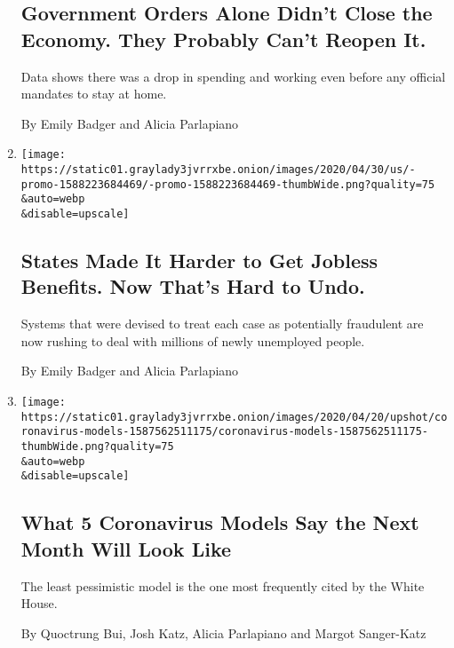 \begin{enumerate}
  \hypertarget{government-orders-alone-didnt-close-the-economy-they-probably-cant-reopen-it}{%
  \subsection{Government Orders Alone Didn't Close the Economy. They
  Probably Can't Reopen
  It.}\label{government-orders-alone-didnt-close-the-economy-they-probably-cant-reopen-it}}

  Data shows there was a drop in spending and working even before any
  official mandates to stay at home.

  By Emily Badger and Alicia Parlapiano
\item
  \href{/2020/04/30/upshot/unemployment-state-restrictions-pandemic.html}{}

  \texttt{[image: https://static01.graylady3jvrrxbe.onion/images/2020/04/30/us/-promo-1588223684469/-promo-1588223684469-thumbWide.png?quality=75\\\&auto=webp\\\&disable=upscale]}

  \hypertarget{states-made-it-harder-to-get-jobless-benefits-now-thats-hard-to-undo}{%
  \subsection{States Made It Harder to Get Jobless Benefits. Now That's
  Hard to
  Undo.}\label{states-made-it-harder-to-get-jobless-benefits-now-thats-hard-to-undo}}

  Systems that were devised to treat each case as potentially fraudulent
  are now rushing to deal with millions of newly unemployed people.

  By Emily Badger and Alicia Parlapiano
\item
  \href{/interactive/2020/04/22/upshot/coronavirus-models.html}{}

  \texttt{[image: https://static01.graylady3jvrrxbe.onion/images/2020/04/20/upshot/coronavirus-models-1587562511175/coronavirus-models-1587562511175-thumbWide.png?quality=75\\\&auto=webp\\\&disable=upscale]}

  \hypertarget{what-5-coronavirus-models-say-the-next-month-will-look-like}{%
  \subsection{What 5 Coronavirus Models Say the Next Month Will Look
  Like}\label{what-5-coronavirus-models-say-the-next-month-will-look-like}}

  The least pessimistic model is the one most frequently cited by the
  White House.

  By Quoctrung Bui, Josh Katz, Alicia Parlapiano and Margot Sanger-Katz
\end{enumerate}

